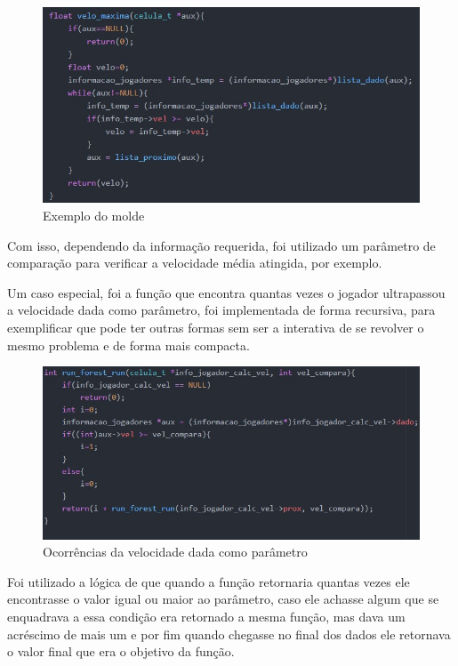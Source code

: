 \documentclass[conference]{IEEEtran}
\begin{document}
\begin{figure}[htb]
	\caption{\label{velmax}Exemplo do molde}
	\begin{center}
	    \includegraphics[scale=0.4]{figs/velo_max.jpg}
	\end{center}
\end{figure}

Com isso, dependendo da informação requerida, foi utilizado um parâmetro de comparação para verificar a velocidade média atingida, por exemplo.

Um caso especial, foi a função que encontra quantas vezes o jogador ultrapassou a velocidade dada como parâmetro, foi implementada de forma recursiva, para exemplificar que pode ter outras formas sem ser a interativa de se revolver o mesmo problema e de forma mais compacta. 

\begin{figure}[htb]
	\caption{\label{Run}Ocorrências da velocidade dada como parâmetro}
	\begin{center}
	    \includegraphics[scale=0.4]{figs/run.jpg}
	\end{center}
\end{figure}

Foi utilizado a lógica de que quando  a função retornaria quantas vezes ele encontrasse o valor igual ou maior ao parâmetro, caso ele achasse algum que se enquadrava a essa condição era retornado a mesma função, mas dava um acréscimo de mais um e por fim quando chegasse no final dos dados ele retornava o valor final que era o objetivo da função.
\end{document}
